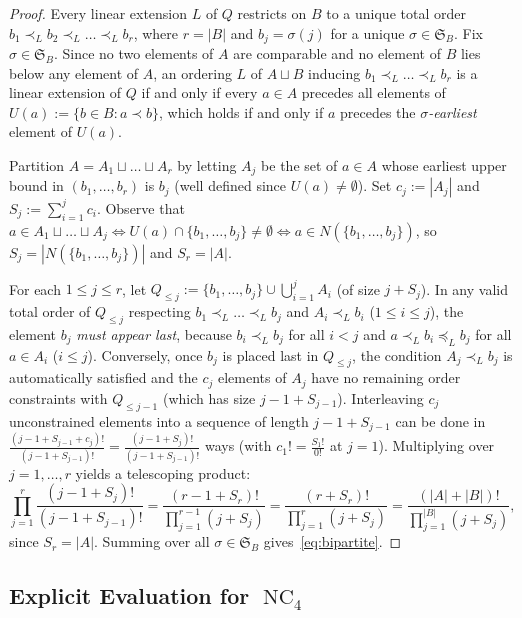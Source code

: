 \documentclass[11pt]{article}
\theoremstyle{definition}
\newcommand{\NC}{\operatorname{NC}}
\newcommand{\Sym}{\mathfrak{S}}
\begin{document}
\begin{proof}
Every linear extension $L$ of $Q$ restricts on $B$ to a unique total order
$b_1 \prec_L b_2 \prec_L \dots \prec_L b_r$, where $r = |B|$ and $b_j = \sigma(j)$ for a
unique $\sigma \in \Sym_B$. Fix $\sigma \in \Sym_B$. Since no two elements of $A$ are
comparable and no element of $B$ lies below any element of $A$, an ordering $L$ of
$A \sqcup B$ inducing $b_1 \prec_L \dots \prec_L b_r$ is a linear extension of $Q$ if and
only if every $a \in A$ precedes all elements of $U(a) := \{b \in B : a \prec b\}$, which
holds if and only if $a$ precedes the \emph{$\sigma$-earliest} element of $U(a)$.

Partition $A = A_1 \sqcup \dots \sqcup A_r$ by letting $A_j$ be the set of $a \in A$
whose earliest upper bound in $(b_1, \dots, b_r)$ is $b_j$ (well defined since $U(a) \ne
\emptyset$). Set $c_j := |A_j|$ and $S_j := \sum_{i=1}^j c_i$. Observe that
$a \in A_1 \sqcup \dots \sqcup A_j \iff U(a) \cap \{b_1, \dots, b_j\} \ne \emptyset \iff
a \in N(\{b_1, \dots, b_j\})$, so $S_j = |N(\{b_1, \dots, b_j\})|$ and $S_r = |A|$.

For each $1 \le j \le r$, let $Q_{\le j} := \{b_1, \dots, b_j\} \cup \bigcup_{i=1}^j A_i$
(of size $j + S_j$). In any valid total order of $Q_{\le j}$ respecting $b_1 \prec_L
\dots \prec_L b_j$ and $A_i \prec_L b_i$ ($1 \le i \le j$), the element $b_j$ \emph{must
appear last}, because $b_i \prec_L b_j$ for all $i < j$ and $a \prec_L b_i \preceq_L b_j$
for all $a \in A_i$ ($i \le j$). Conversely, once $b_j$ is placed last in $Q_{\le j}$,
the condition $A_j \prec_L b_j$ is automatically satisfied and the $c_j$ elements of
$A_j$ have no remaining order constraints with $Q_{\le j-1}$ (which has size
$j - 1 + S_{j-1}$). Interleaving $c_j$ unconstrained elements into a sequence of length
$j - 1 + S_{j-1}$ can be done in $\frac{(j - 1 + S_{j-1} + c_j)!}{(j - 1 + S_{j-1})!} =
\frac{(j - 1 + S_j)!}{(j - 1 + S_{j-1})!}$ ways (with $c_1! = \frac{S_1!}{0!}$ at $j = 1$).
Multiplying over $j = 1, \dots, r$ yields a telescoping product:
\[
  \prod_{j=1}^r \frac{(j - 1 + S_j)!}{(j - 1 + S_{j-1})!}
  = \frac{(r - 1 + S_r)!}{\prod_{j=1}^{r-1} (j + S_j)}
  = \frac{(r + S_r)!}{\prod_{j=1}^r (j + S_j)}
  = \frac{(|A| + |B|)!}{\prod_{j=1}^{|B|} (j + S_j)},
\]
since $S_r = |A|$. Summing over all $\sigma \in \Sym_B$ gives~\eqref{eq:bipartite}.
\end{proof}

\subsection{Explicit Evaluation for \texorpdfstring{$\NC_4$}{NC4}}
\end{document}
